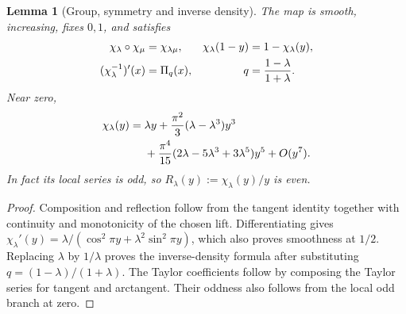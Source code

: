 \documentclass[11pt]{article}
\newtheorem{lemma}[theorem]{Lemma}
\theoremstyle{definition}\newtheorem{definition}[theorem]{Definition}
\theoremstyle{remark}\newtheorem{remark}[theorem]{Remark}
\begin{document}
\begin{lemma}[Group, symmetry and inverse density]\label{lem:chi}
The map is smooth, increasing, fixes $0,1$, and satisfies
\begin{align}\label{eq:chi-laws}
\chi_\lambda\circ\chi_\mu&=\chi_{\lambda\mu},&
\chi_\lambda(1-y)&=1-\chi_\lambda(y),\\
(\chi_\lambda^{-1})'(x)&=\Pi_q(x),&
q&=\frac{1-\lambda}{1+\lambda}.\notag
\end{align}
Near zero,
\begin{align}\label{eq:chi-jet}
\chi_\lambda(y)={}&\lambda y
+\frac{\pi^2}{3}(\lambda-\lambda^3)y^3\\
&+\frac{\pi^4}{15}(2\lambda-5\lambda^3+3\lambda^5)y^5+O(y^7).\notag
\end{align}
In fact its local series is odd, so $R_\lambda(y):=\chi_\lambda(y)/y$ is even.
\end{lemma}
\begin{proof}
Composition and reflection follow from the tangent identity together with continuity and monotonicity of the chosen lift. Differentiating gives
$\chi_\lambda'(y)=\lambda/(\cos^2\pi y+\lambda^2\sin^2\pi y)$,
which also proves smoothness at $1/2$. Replacing $\lambda$ by $1/\lambda$ proves the inverse-density formula after substituting $q=(1-\lambda)/(1+\lambda)$. The Taylor coefficients follow by composing the Taylor series for tangent and arctangent. Their oddness also follows from the local odd branch at zero.
\end{proof}
\end{document}

